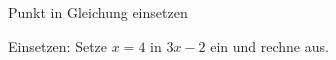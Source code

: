 \setcounter{aufgabe}{18}

\begin{aufgabe}{Punkt in Gleichung einsetzen}
\begin{teile}
\teil Einsetzen: Setze $x = 4$ in $3x - 2$ ein und rechne aus.
\end{teile}
\end{aufgabe}

